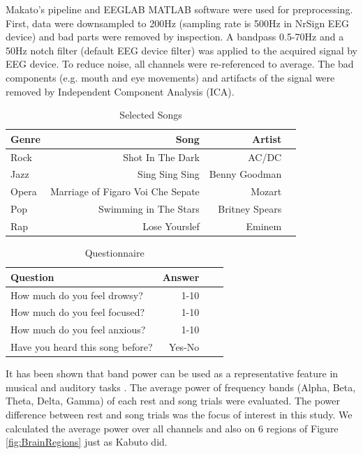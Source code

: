 \documentclass[9pt,twocolumn]{paper-template}
\begin{document}
Makato’s pipeline \cite{Makato} and EEGLAB MATLAB software \cite{eeglab} were used for preprocessing. First, data were downsampled to 200Hz (sampling rate is 500Hz in NrSign EEG device) and bad parts were removed by inspection. A bandpass 0.5-70Hz and a 50Hz notch filter (default EEG device filter) was applied to the acquired signal by EEG device. To reduce noise, all channels were re-referenced to average. The bad components (e.g. mouth and eye movements) and artifacts of the signal were removed by Independent Component Analysis (ICA).


\begin{table}[tbhp]
\centering
\caption{Selected Songs}
\label{table:Songs}
\begin{tabular}{lrrr}
Genre & Song & Artist\\
\midrule
Rock & Shot In The Dark & AC/DC\\
Jazz & Sing Sing Sing & Benny Goodman\\
Opera & Marriage of Figaro Voi Che Sepate & Mozart\\
Pop & Swimming in The Stars & Britney Spears\\
Rap & Lose Yourslef & Eminem\\
\bottomrule
\end{tabular}
\end{table}

\begin{table}[tbhp]
\centering
\caption{Questionnaire}
\label{table:Ques}
\begin{tabular}{lrrr}
Question & Answer\\
\midrule
How much do you feel drowsy? & 1-10\\
How much do you feel focused? & 1-10\\
How much do you feel anxious? & 1-10\\
Have you heard this song before? & Yes-No\\
\bottomrule
\end{tabular}
\end{table}

It has been shown that band power can be used as a representative feature in musical and auditory tasks \cite{kabuto1993}. The average power of frequency bands (Alpha, Beta, Theta, Delta, Gamma) of each rest and song trials were evaluated. The power difference between rest and song trials was the focus of interest in this study. We calculated the average power over all channels and also on 6 regions of Figure \ref{fig:BrainRegions} just as Kabuto \cite{kabuto1993} did.\\
\end{document}
